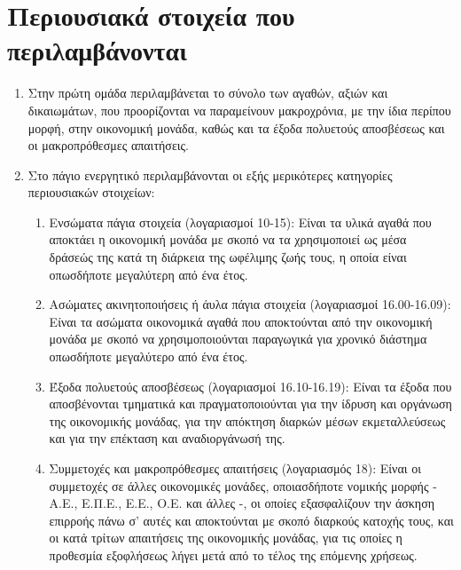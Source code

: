 \documentclass[A4,10pt,greek]{book}
\begin{document}
\section{Περιουσιακά στοιχεία που περιλαμβάνονται}
\begin{enumerate}

\item Στην πρώτη ομάδα περιλαμβάνεται το σύνολο των αγαθών, αξιών και δικαιωμάτων, που προορίζονται να παραμείνουν μακροχρόνια, με την ίδια περίπου μορφή, στην οικονομική μονάδα, καθώς και τα έξοδα πολυετούς αποσβέσεως και οι μακροπρόθεσμες απαιτήσεις.

\item Στο πάγιο ενεργητικό περιλαμβάνονται οι εξής μερικότερες κατηγορίες περιουσιακών στοιχείων:
\begin{enumerate}
\item Ενσώματα πάγια στοιχεία (λογαριασμοί 10-15): Είναι τα υλικά αγαθά που αποκτάει η οικονομική μονάδα με σκοπό να τα χρησιμοποιεί ως μέσα δράσεώς της κατά τη διάρκεια της ωφέλιμης ζωής τους, η οποία είναι οπωσδήποτε μεγαλύτερη από ένα έτος.

\item Ασώματες ακινητοποιήσεις ή άυλα πάγια στοιχεία (λογαριασμοί 16.00-16.09): Είναι τα ασώματα οικονομικά αγαθά που αποκτούνται από την οικονομική μονάδα με σκοπό να χρησιμοποιούνται παραγωγικά για χρονικό διάστημα οπωσδήποτε μεγαλύτερο από ένα έτος.

\item Έξοδα πολυετούς αποσβέσεως (λογαριασμοί 16.10-16.19): Είναι τα έξοδα που αποσβένονται τμηματικά και πραγματοποιούνται για την ίδρυση και οργάνωση της οικονομικής μονάδας, για την απόκτηση διαρκών μέσων εκμεταλλεύσεως και για την επέκταση και αναδιοργάνωσή της.

\item Συμμετοχές και μακροπρόθεσμες απαιτήσεις (λογαριασμός 18): Είναι οι συμμετοχές σε άλλες οικονομικές μονάδες, οποιασδήποτε νομικής μορφής - Α.Ε., Ε.Π.Ε., Ε.Ε., Ο.Ε. και άλλες -, οι οποίες εξασφαλίζουν την άσκηση επιρροής πάνω σ' αυτές και αποκτούνται με σκοπό διαρκούς κατοχής τους, και οι κατά τρίτων απαιτήσεις της οικονομικής μονάδας, για τις οποίες η προθεσμία εξοφλήσεως λήγει μετά από το τέλος της επόμενης χρήσεως.
\end{enumerate}
\end{enumerate}
\end{document}
